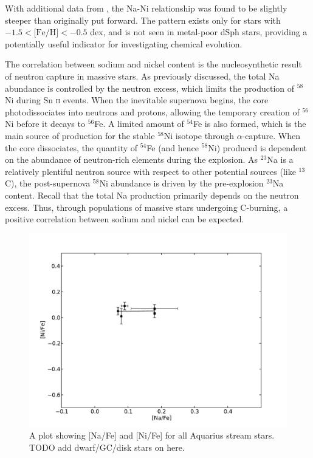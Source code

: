 \documentclass{emulateapj}
\begin{document}
With additional data from \citet{nissen;schuster_2011}, the Na-Ni relationship was found to be slightly steeper than originally put forward. The pattern exists only for stars with $-1.5 < \mbox{[Fe/H]} < -0.5$ dex, and is not seen in metal-poor dSph stars, providing a potentially useful indicator for investigating chemical evolution. 


The correlation between sodium and nickel content is the nucleosynthetic result of neutron capture in massive stars. As previously discussed, the total Na abundance is controlled by the neutron excess, which limits the production of $^{58}$Ni during Sn \textsc{ii} events. When the inevitable supernova begins, the core photodissociates into neutrons and protons, allowing the temporary creation of $^{56}$Ni before it decays to $^{56}$Fe. A limited amount of $^{54}$Fe is also formed, which is the main source of production for the stable $^{58}$Ni isotope through $\alpha$-capture. When the core dissociates, the quantity of $^{54}$Fe (and hence $^{58}$Ni) produced is dependent on the abundance of neutron-rich elements during the explosion. As $^{23}$Na is a relatively plentiful neutron source with respect to other potential sources (like $^{13}$C), the post-supernova $^{58}$Ni abundance is driven by the pre-explosion $^{23}$Na content. Recall that the total Na production primarily depends on the neutron excess. Thus, through populations of massive stars undergoing C-burning, a positive correlation between sodium and nickel can be expected. 


\begin{figure}[h]
	\includegraphics[width=\columnwidth]{./figures/aquarius-na-ni.pdf}
	\caption{A plot showing [Na/Fe] and [Ni/Fe] for all Aquarius stream stars. TODO add dwarf/GC/disk stars on here.}
	\label{fig:na-ni}
\end{figure}
\end{document}
